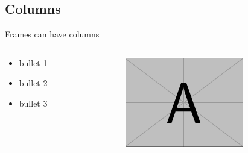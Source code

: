 \documentclass{beamer}
\begin{document}
\subsection{Columns}
\begin{frame}
    Frames can have columns
    \begin{columns}[T]
        \begin{column}{.5\textwidth}
            \begin{itemize}[<+>]
                \item bullet 1
                \item bullet 2
                \item bullet 3
            \end{itemize} 
        \end{column}
        \begin{column}{.5\textwidth}
            \begin{block}{}
                \includegraphics[width=\textwidth]{images/examples/image-a.png}
            \end{block}
        \end{column}
    \end{columns}
\end{frame}
\end{document}
